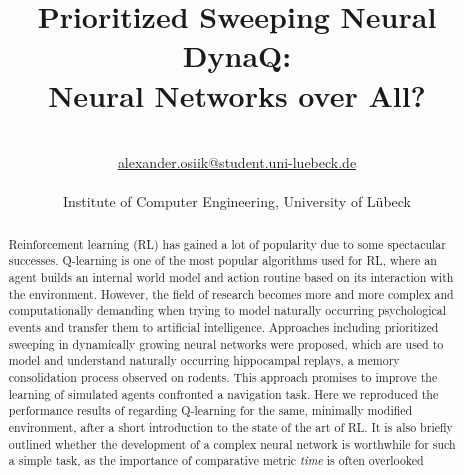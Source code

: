 \documentclass[a4paper]{article}
\title{\textbf{Prioritized Sweeping Neural DynaQ:\\ Neural Networks over All?}}\let\Title\@title
\author{\AuthorName\\
	\href{mailto:alexander.osiik@student.uni-luebeck.de}{alexander.osiik@student.uni-luebeck.de}\\
	\small \seminar\\
	\small Institute of Computer Engineering, University of L\"ubeck\\
}\let\Author\@author
\begin{document}
	\maketitle
	
	\begin{abstract}
		\noindent%
		Reinforcement learning (RL) has gained a lot of popularity due to some spectacular successes. Q-learning is one of the most popular algorithms used for RL, where an agent builds an internal world model and action routine based on its interaction with the environment. However, the field of research becomes more and more complex and computationally demanding when trying to model naturally occurring psychological events and transfer them to artificial intelligence. Approaches including prioritized sweeping in dynamically growing neural networks were proposed, which are used to model and understand naturally occurring hippocampal replays, a memory consolidation process observed on rodents. This approach promises to improve the learning of simulated agents confronted a navigation task.
		Here we reproduced the performance results of \citet{NeuralDynaQ} regarding Q-learning for the same, minimally modified environment, after a short introduction to the state of the art of RL. It is also briefly outlined whether the development of a complex neural network is worthwhile for such a simple task, as the importance of comparative metric \textit{time} is often overlooked
	\end{abstract}
	
	
\end{document}
